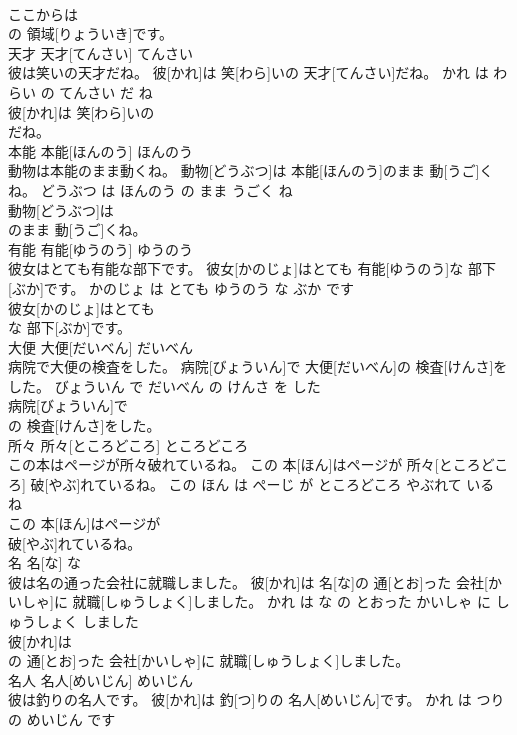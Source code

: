 \documentclass[8pt]{extreport}
\begin{document}
\begin{CJK}{UTF8}{min}
\\	ここからは
\\	の 領域[りょういき]です。			
\\	天才	天才[てんさい]	てんさい	
\\	彼は笑いの天才だね。	彼[かれ]は 笑[わら]いの 天才[てんさい]だね。	かれ は わらい の てんさい だ ね	
\\	彼[かれ]は 笑[わら]いの
\\	だね。			
\\	本能	本能[ほんのう]	ほんのう	
\\	動物は本能のまま動くね。	動物[どうぶつ]は 本能[ほんのう]のまま 動[うご]くね。	どうぶつ は ほんのう の まま うごく ね	
\\	動物[どうぶつ]は
\\	のまま 動[うご]くね。			
\\	有能	有能[ゆうのう]	ゆうのう	
\\	彼女はとても有能な部下です。	彼女[かのじょ]はとても 有能[ゆうのう]な 部下[ぶか]です。	かのじょ は とても ゆうのう な ぶか です	
\\	彼女[かのじょ]はとても
\\	な 部下[ぶか]です。			
\\	大便	大便[だいべん]	だいべん	
\\	病院で大便の検査をした。	病院[びょういん]で 大便[だいべん]の 検査[けんさ]をした。	びょういん で だいべん の けんさ を した	
\\	病院[びょういん]で
\\	の 検査[けんさ]をした。			
\\	所々	所々[ところどころ]	ところどころ	
\\	この本はページが所々破れているね。	この 本[ほん]はページが 所々[ところどころ] 破[やぶ]れているね。	この ほん は ぺーじ が ところどころ やぶれて いる ね	
\\	この 本[ほん]はページが
\\	破[やぶ]れているね。			
\\	名	名[な]	な	
\\	彼は名の通った会社に就職しました。	彼[かれ]は 名[な]の 通[とお]った 会社[かいしゃ]に 就職[しゅうしょく]しました。	かれ は な の とおった かいしゃ に しゅうしょく しました	
\\	彼[かれ]は
\\	の 通[とお]った 会社[かいしゃ]に 就職[しゅうしょく]しました。			
\\	名人	名人[めいじん]	めいじん	
\\	彼は釣りの名人です。	彼[かれ]は 釣[つ]りの 名人[めいじん]です。	かれ は つり の めいじん です	

\end{CJK}
\end{document}
